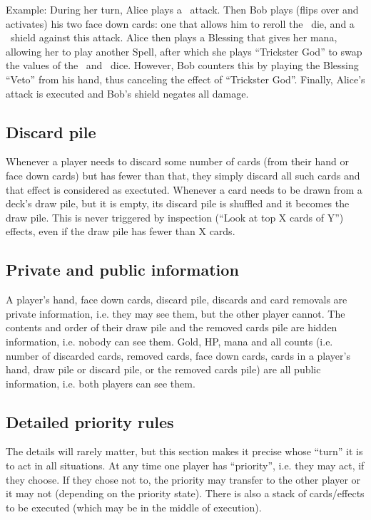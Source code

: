 \documentclass[dvipsnames,parskip,a4paper]{scrartcl}
\newcommand{\iconsize}{3.4mm}
\newcommand{\icondepth}{0.45mm}
\newcommand{\icon}[1]{\raisebox{-\icondepth}{\texttt{[image:  \#1 ]}}}
\newcommand{\fire}{\icon{icons/fire.png}}
\newcommand{\water}{\icon{icons/water.png}}
\begin{document}
\vspace{4pt}

Example: During her turn, Alice plays a \fire \ attack. Then Bob plays (flips over and activates) his two face down cards: one that allows him to reroll the \fire \ die, and a \water \ shield against this attack. Alice then plays a Blessing that gives her mana, allowing her to play another Spell, after which she plays ``Trickster God'' to swap the values of the \fire \ and \water \ dice. However, Bob counters this by playing the Blessing ``Veto'' from his hand, thus canceling the effect of ``Trickster God''. Finally, Alice's attack is executed and Bob's shield negates all damage.

\subsection*{Discard pile}

Whenever a player needs to discard some number of cards (from their hand or face down cards) but has fewer than that, they simply discard all such cards and that effect is considered as exectuted. Whenever a card needs to be drawn from a deck's draw pile, but it is empty, its discard pile is shuffled and it becomes the draw pile. This is never triggered by inspection (``Look at top X cards of Y'') effects, even if the draw pile has fewer than X cards.

\subsection*{Private and public information}

A player's hand, face down cards, discard pile, discards and card removals are private information, i.e. they may see them, but the other player cannot. The contents and order of their draw pile and the removed cards pile are hidden information, i.e. nobody can see them. Gold, HP, mana and all counts (i.e. number of discarded cards, removed cards, face down cards, cards in a player's hand, draw pile or discard pile, or the removed cards pile) are all public information, i.e. both players can see them.

\subsection*{Detailed priority rules}

The details will rarely matter, but this section makes it precise whose ``turn'' it is to act in all situations. At any time one player has ``priority'', i.e. they may act, if they choose. If they chose not to, the priority may transfer to the other player or it may not (depending on the priority state). There is also a stack of cards/effects to be executed (which may be in the middle of execution).
\end{document}
